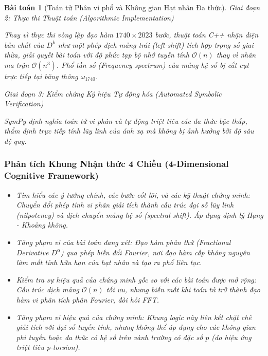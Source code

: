 \documentclass{article}
\newtheorem{baitoan}{Bài toán}
\begin{document}
\begin{baitoan}[Toán tử Phân vi phổ và Không gian Hạt nhân Đa thức]
\vspace{0.5em}\noindent\emph{Giai đoạn 2: Thực thi Thuật toán (Algorithmic Implementation)}
 
 Thay vì thực thi vòng lặp đạo hàm $1740 \times 2023$ bước, thuật toán C++ nhận diện bản chất của $D^k$ như một phép dịch mảng trái (left-shift) tích hợp trọng số giai thừa, giải quyết bài toán với độ phức tạp bộ nhớ tuyến tính $\mathcal{O}(n)$ thay vì nhân ma trận $\mathcal{O}(n^3)$. Phổ tần số (Frequency spectrum) của mảng hệ số bị cắt cụt trực tiếp tại băng thông $\omega_{1740}$.



\vspace{0.5em}\noindent\emph{Giai đoạn 3: Kiểm chứng Ký hiệu Tự động hóa (Automated Symbolic Verification)}
 
 \textsf{SymPy} định nghĩa toán tử vi phân và tự động triệt tiêu các đa thức bậc thấp, thẩm định trực tiếp tính lũy linh của ánh xạ mà không bị ảnh hưởng bởi độ sâu đệ quy.



 \subsubsection*{Phân tích Khung Nhận thức 4 Chiều (4-Dimensional Cognitive Framework)}
 \begin{itemize}
 \item \textit{Tìm hiểu các ý tưởng chính, các bước cốt lõi, và các kỹ thuật chứng minh}: Chuyển đổi phép tính vi phân giải tích thành cấu trúc đại số lũy linh (nilpotency) và dịch chuyển mảng hệ số (spectral shift). Áp dụng định lý Hạng - Khoảng không.
 \item \textit{Tăng phạm vi của bài toán đang xét}: Đạo hàm phân thứ (Fractional Derivative $D^\alpha$) qua phép biến đổi Fourier, nơi đạo hàm cấp không nguyên làm mất tính hữu hạn của hạt nhân và tạo ra phổ liên tục.
 \item \textit{Kiểm tra sự hiệu quả của chứng minh gốc so với các bài toán được mở rộng}: Cấu trúc dịch mảng $\mathcal{O}(n)$ tối ưu, nhưng biến mất khi toán tử trở thành đạo hàm vi phân tích phân Fourier, đòi hỏi FFT.
 \item \textit{Tăng phạm vi hiệu quả của chứng minh}: Khung logic này liên kết chặt chẽ giải tích với đại số tuyến tính, nhưng không thể áp dụng cho các không gian phi tuyến hoặc đa thức có hệ số trên vành trường có đặc số $p$ (do hiệu ứng triệt tiêu p-torsion).
 \end{itemize}
\end{baitoan}
\end{document}
